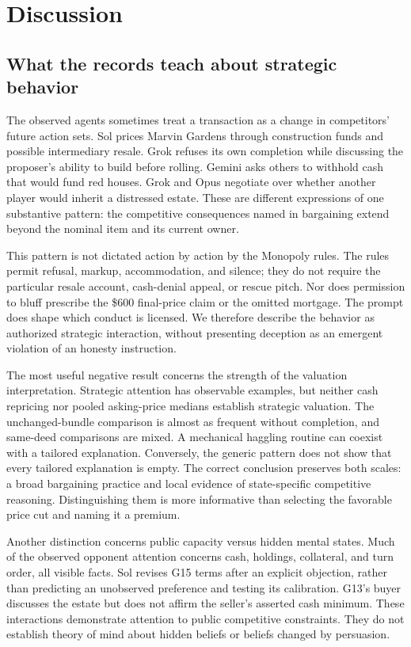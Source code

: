 \section{Discussion}

\subsection{What the records teach about strategic behavior}

The observed agents sometimes treat a transaction as a change in competitors' future action sets. Sol prices Marvin Gardens through construction funds and possible intermediary resale. Grok refuses its own completion while discussing the proposer's ability to build before rolling. Gemini asks others to withhold cash that would fund red houses. Grok and Opus negotiate over whether another player would inherit a distressed estate. These are different expressions of one substantive pattern: the competitive consequences named in bargaining extend beyond the nominal item and its current owner.

This pattern is not dictated action by action by the Monopoly rules. The rules permit refusal, markup, accommodation, and silence; they do not require the particular resale account, cash-denial appeal, or rescue pitch. Nor does permission to bluff prescribe the \$600 final-price claim or the omitted mortgage. The prompt does shape which conduct is licensed. We therefore describe the behavior as authorized strategic interaction, without presenting deception as an emergent violation of an honesty instruction.

The most useful negative result concerns the strength of the valuation interpretation. Strategic attention has observable examples, but neither cash repricing nor pooled asking-price medians establish strategic valuation. The unchanged-bundle comparison is almost as frequent without completion, and same-deed comparisons are mixed. A mechanical haggling routine can coexist with a tailored explanation. Conversely, the generic pattern does not show that every tailored explanation is empty. The correct conclusion preserves both scales: a broad bargaining practice and local evidence of state-specific competitive reasoning. Distinguishing them is more informative than selecting the favorable price cut and naming it a premium.

Another distinction concerns public capacity versus hidden mental states. Much of the observed opponent attention concerns cash, holdings, collateral, and turn order, all visible facts. Sol revises G15 terms after an explicit objection, rather than predicting an unobserved preference and testing its calibration. G13's buyer discusses the estate but does not affirm the seller's asserted cash minimum. These interactions demonstrate attention to public competitive constraints. They do not establish theory of mind about hidden beliefs or beliefs changed by persuasion.

